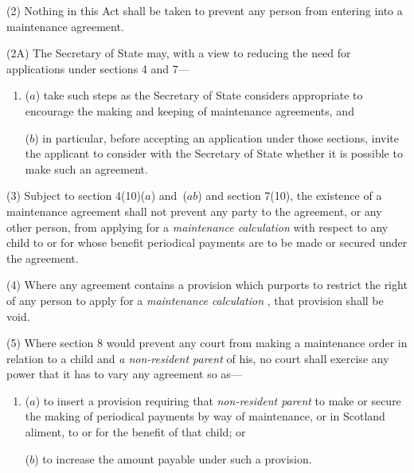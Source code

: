 \documentclass[12pt,a4paper]{article}
\begin{document}
(2) Nothing in this Act shall be taken to prevent any person from entering into a maintenance agreement.

(2A) The 
Secretary of State  %
may, with a view to reducing the need for applications under sections 4 and 7—
\begin{enumerate}\item[]
($a$) take such steps as 
the Secretary of State  %
considers appropriate to encourage the making and keeping of maintenance agreements, and

($b$) in particular, before accepting an application under those sections, invite the applicant to consider with the 
Secretary of State  %
whether it is possible to make such an agreement.
\end{enumerate}

(3) 
Subject to section 4(10)($a$) 
and~($ab$)  %
and section 7(10),  %
the existence of a maintenance agreement shall not prevent any party to the agreement, or any other person, from applying for a 
\emph{maintenance calculation}  %
with respect to any child to or for whose benefit periodical payments are to be made or secured under the agreement.

(4) Where any agreement contains a provision which purports to restrict the right of any person to apply for a 
\emph{maintenance calculation}%
, that provision shall be void.

(5) Where section 8 would prevent any court from making a maintenance order in relation to a child and 
\emph{a non-resident parent}  %
of his, no court shall exercise any power that it has to vary any agreement so as—
\begin{enumerate}\item[]
($a$) to insert a provision requiring that 
\emph{non-resident parent}  %
to make or secure the making of periodical payments by way of maintenance, or in Scotland aliment, to or for the benefit of that child; or

($b$) to increase the amount payable under such a provision.
\end{enumerate}
\end{document}

